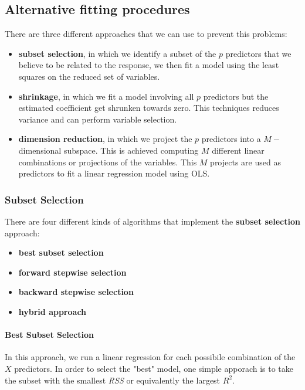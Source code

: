 \subsection{Alternative fitting procedures}
There are three different approaches that we can use to prevent this problems:
\begin{itemize}
    \item \textbf{subset selection}, in which we identify a subset of the $p$ predictors that we believe to be related to the response, we then fit a model using the least squares on the reduced set of variables.
    \item \textbf{shrinkage}, in which we fit a model involving all $p$ predictors but the estimated coefficient get shrunken towards zero. This techniques reduces variance and can perform variable selection.
    \item \textbf{dimension reduction}, in which we project the $p$ predictors into a $M-$dimensional subspace. This is achieved computing $M$ different linear combinations or projections of the variables. This $M$ projects are used as predictors to fit a linear regression model using OLS.
\end{itemize}

\subsubsection*{Subset Selection}
There are four different kinds of algorithms that implement the \textbf{subset selection} approach:
\begin{itemize}
    \item \textbf{best subset selection}
    \item \textbf{forward stepwise selection}
    \item \textbf{backward stepwise selection}
    \item \textbf{hybrid approach}
\end{itemize}

\paragraph*{Best Subset Selection}
In this approach, we run a linear regression for each possibile combination of the $X$ predictors. In order to select the "best" model, one simple apporach is to take the subset with the smallest \textit{RSS} or equivalently the largest $R^2$.


